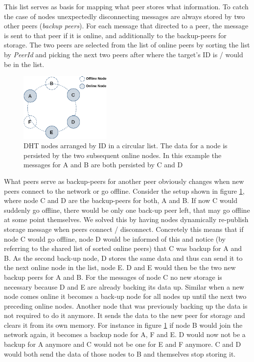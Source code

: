 This list serves as basis for mapping what peer stores what information.
To catch the case of nodes unexpectedly disconnecting messages are always stored by two other peers (\textit{backup peers}).
For each message that directed to a peer, the message is sent to that peer if it is online, and additionally to the backup-peers for storage.
The two peers are selected from the list of online peers by sorting the list by \textit{PeerId} and picking the next two peers after where the target's ID is / would be in the list.

\begin{figure}[h]
    \centering
    \includegraphics[width=0.4\textwidth]{assets/dht.png}
    \caption{DHT nodes arranged by ID in a circular list. The data for a node is persisted by the two subsequent online nodes. In this example the messages for A and B are both persisted by C and D}
    \label{fig:dht}
\end{figure}

What peers serve as backup-peers for another peer obviously changes when new peers connect to the network or go offline.
Consider the setup shown in figure \ref{fig:dht}, where node C and D are the backup-peers for both, A and B. 
If now C would suddenly go offline, there would be only one back-up peer left, that may go offline at some point themselves. 
We solved this by having nodes dynamically re-publish storage message when peers connect / disconnect. 
Concretely this means that if node C would go offline, node D would be informed of this and notice (by referring to the shared list of sorted online peers) that C was backup for A and B. 
As the second back-up node, D stores the same data and thus can send it to the next online node in the list, node E.
D and E would then be the two new backup peers for A and B.
For the messages of node C no new storage is necessary because D and E are already backing its data up. 
Similar when a new node comes online it becomes a back-up node for all nodes up until the next two preceding online nodes.
Another node that was previously backing up the data is not required to do it anymore. 
It sends the data to the new peer for storage and clears it from its own memory.
For instance in figure \ref{fig:dht} if node B would join the network again, it becomes a backup node for A, F and E. 
D would now not be a backup for A anymore and C would not be one for E and F anymore. 
C and D would both send the data of those nodes to B and themselves stop storing it.



